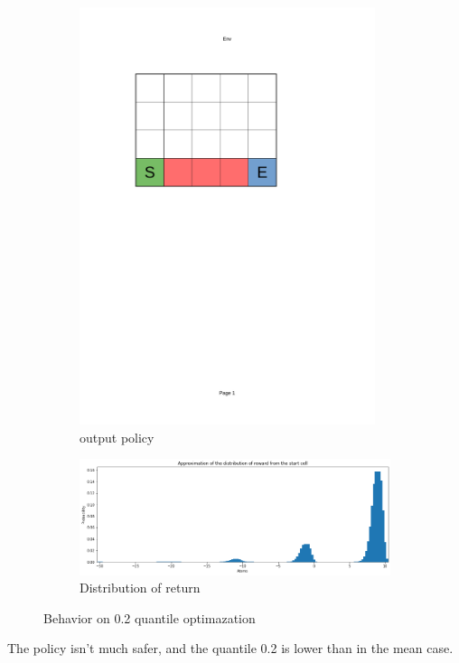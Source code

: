 \documentclass[10pt]{beamer}
\begin{document}
\begin{frame}
    \begin{figure}[!ht]
        \centering
        \begin{subfigure}{0.25\textwidth}
            \centering
                \includegraphics[page=6, trim = 40mm 160mm 70mm 45mm, clip, width=0.95\textwidth]{figures/personal_work/policies.pdf}
            \caption{output policy}
        \end{subfigure}
        \hfill
        \begin{subfigure}{0.70\textwidth}
            \centering
                \includegraphics[width=\textwidth]{figures/personal_work/distrib_q20.png}
            \caption{Distribution of return}
        \end{subfigure}
            \caption{Behavior on 0.2 quantile optimazation}
    \end{figure}

    The policy isn’t much safer, and the quantile 0.2 is lower than in the mean case.
\end{frame}
\end{document}

